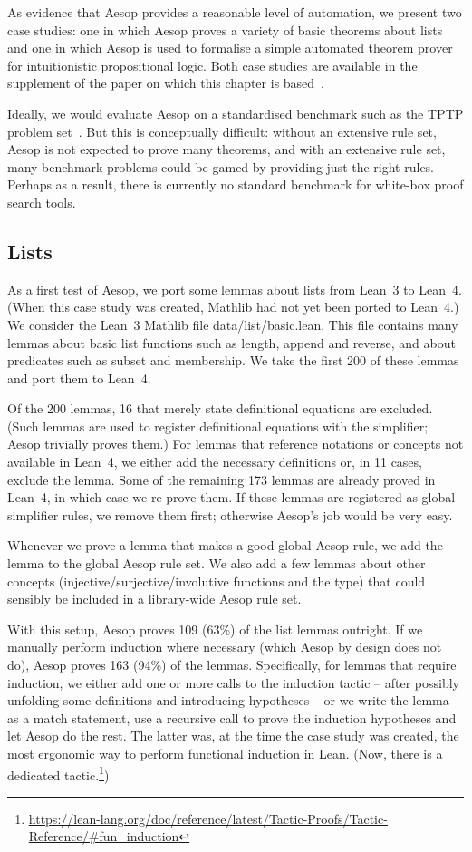 As evidence that Aesop provides a reasonable level of automation, we present two case studies: one in which Aesop proves a variety of basic theorems about lists and one in which Aesop is used to formalise a simple automated theorem prover for intuitionistic propositional logic.
Both case studies are available in the supplement of the paper on which this chapter is based~\cite{AesopSupplement}.

Ideally, we would evaluate Aesop on a standardised benchmark such as the TPTP problem set~\cite{TPTP}.
But this is conceptually difficult: without an extensive rule set, Aesop is not expected to prove many theorems, and with an extensive rule set, many benchmark problems could be gamed by providing just the right rules.
Perhaps as a result, there is currently no standard benchmark for white-box proof search tools.


\subsection{Lists}%
\label{sec:aesop:lists}

As a first test of Aesop, we port some lemmas about lists from Lean~3 to Lean~4.
(When this case study was created, Mathlib had not yet been ported to Lean~4.)
We consider the Lean~3 Mathlib file \textsf{data/list/basic.lean}.
This file contains many lemmas about basic list functions such as \textsf{length}, \textsf{append} and \textsf{reverse}, and about predicates such as subset and membership.
We take the first 200 of these lemmas and port them to Lean~4.

Of the 200 lemmas, 16 that merely state definitional equations are excluded.
(Such lemmas are used to register definitional equations with the simplifier; Aesop trivially proves them.)
For lemmas that reference notations or concepts not available in Lean~4, we either add the necessary definitions or, in 11 cases, exclude the lemma.
Some of the remaining 173 lemmas are already proved in Lean~4, in which case we re-prove them.
If these lemmas are registered as global simplifier rules, we remove them first; otherwise Aesop's job would be very easy.

Whenever we prove a lemma that makes a good global Aesop rule, we add the lemma to the global Aesop rule set.
We also add a few lemmas about other concepts (injective/surjective/involutive functions and the  type) that could sensibly be included in a library-wide Aesop rule set.

With this setup, Aesop proves 109 (63\%) of the list lemmas outright.
If we manually perform induction where necessary (which Aesop by design does not do), Aesop proves 163 (94\%) of the lemmas.
Specifically, for lemmas that require induction, we either add one or more calls to the induction tactic -- after possibly unfolding some definitions and introducing hypotheses -- or we write the lemma as a match statement, use a recursive call to prove the induction hypotheses and let Aesop do the rest.
The latter was, at the time the case study was created, the most ergonomic way to perform functional induction in Lean.
(Now, there is a dedicated  tactic.\footnote{\url{https://lean-lang.org/doc/reference/latest/Tactic-Proofs/Tactic-Reference/\#fun_induction}})

